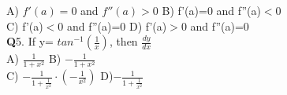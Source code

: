 \documentclass{article}
\newcommand{\q}{\textbf{Q}}
\begin{document}
A) \quad $f'(a)=0$ and \quad$f''(a)>0$  \hspace{4.2 cm}
B) f'(a)=0 and f''(a)\quad$<0$\\
C) f'(a)\quad$<$0 and f''(a)=0 \hspace{5 cm}
D) f'(a)\quad$>$0 and f''(a)=0 \vspace{1 em} \\
\q5. If y= $tan^{-1}(\frac{1}{x})$, then $\frac{dy}{dx}$ \\
A) $\frac{1}{1+x^2}$ \hspace{5.5 cm}
B) $-\frac{1}{1+x^2}$\\
C) $-\frac{1}{1+\frac{1}{x^2}}\cdot\left(-\frac{1}{x^2}\right)$ \hspace{4 cm}
D)$-\frac{1}{1+\frac{1}{x^2}}$
\vspace{1 em}\\
\end{document}
